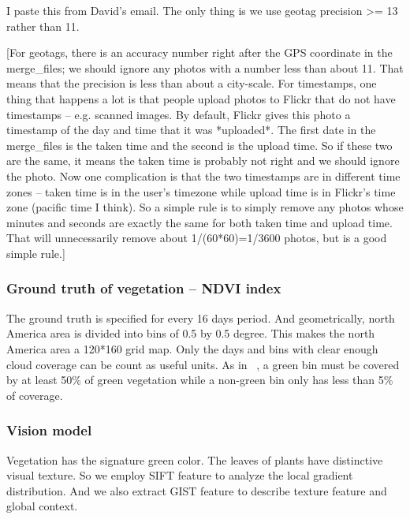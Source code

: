 I paste this from David's email. The only thing is we use geotag precision >= 13 rather than 11. 

[For geotags, there is an
accuracy number right after the GPS coordinate in the merge\_files; we
should ignore any photos with a number less than about 11. That means
that the precision is less than about a city-scale. For timestamps,
one thing that happens a lot is that people upload photos to Flickr
that do not have timestamps -- e.g. scanned images. By default, Flickr
gives this photo a timestamp of the day and time that it was
*uploaded*. The first date in the merge\_files is the taken time and
the second is the upload time. So if these two are the same, it means
the taken time is probably not right and we should ignore the photo.
Now one complication is that the two timestamps are in different time
zones -- taken time is in the user's timezone while upload time is in
Flickr's time zone (pacific time I think). So a simple rule is to
simply remove any photos whose minutes and seconds are exactly the
same for both taken time and upload time. That will unnecessarily
remove about 1/(60*60)=1/3600 photos, but is a good simple rule.]




\subsubsection*{Ground truth of vegetation -- NDVI index}
The ground truth is specified for every 16 days period. 
And geometrically, north America area is divided into bins of 0.5 by 0.5 degree. This makes the north America area a 120*160 grid map.
Only the days and bins with clear enough cloud coverage can be count as useful units. As in ~\cite{www paper}, a green bin must be covered by at least 50\% of green vegetation while a non-green bin only has less than 5\% of coverage.


\subsubsection*{Vision model}
Vegetation has the signature green color. The leaves of plants have distinctive visual texture. So we employ SIFT feature to analyze the local gradient distribution. And we also extract GIST feature to describe texture feature and global context. 





